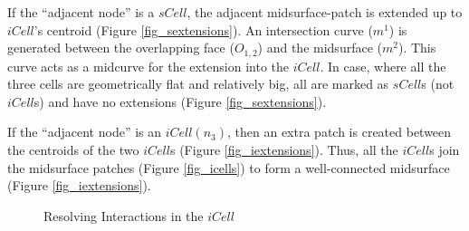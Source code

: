 \begin{myrule}
\label{def:sicell}
If the ``adjacent node'' is a $sCell$, the adjacent midsurface-patch is extended up to $iCell$'s centroid (Figure  \ref{fig_sextensions}). An intersection curve ($m^1$) is generated between the overlapping face ($O_{1,2}$) and the midsurface ($m^2$). This curve acts as a midcurve for the extension into the $iCell$. In case, where all the three cells are geometrically flat and relatively big, all are marked as  $sCell$s (not $iCell$s) and have no extensions (Figure \ref{fig_sextensions}).
\end{myrule}

\begin{myrule}
\label{def:iicell}
If the ``adjacent node'' is an $iCell(n_3)$, then an extra patch is created between the centroids of the two $iCell$s (Figure  \ref{fig_iextensions}). Thus, all the $iCell$s join the midsurface patches (Figure \ref{fig_icells}) to form a well-connected midsurface (Figure \ref{fig_iextensions}).
\end{myrule}

	\begin{figure}[!h]
	\centering     %
	\caption{Resolving Interactions in the $iCell$}
	\label{fig_resolveiCell}
	\end{figure}

